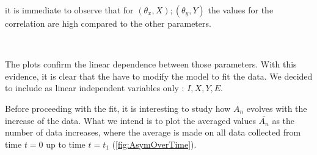 it is immediate to observe that for $(\theta_{x},X);(\theta_{y},Y)$ the values for the correlation are high compared to the other parameters. 

\begin{figure}[hbtp]
\centering
{}
\\
\end{figure}

The plots confirm the linear dependence between those parameters. With this evidence, it is clear that the have to modify the model to fit the data. We decided to include as linear independent variables only : $I,X,Y,E$.

Before proceeding with the fit, it is interesting to study how $A_{n}$ evolves with the increase of the data. What we intend is to plot the averaged values $\overline{A_{n}}$ as the number of data increases, where the average is made on all data collected from time $t = 0$ up to time $t = t_{1}$ (\ref{fig:AsymOverTime}). 

